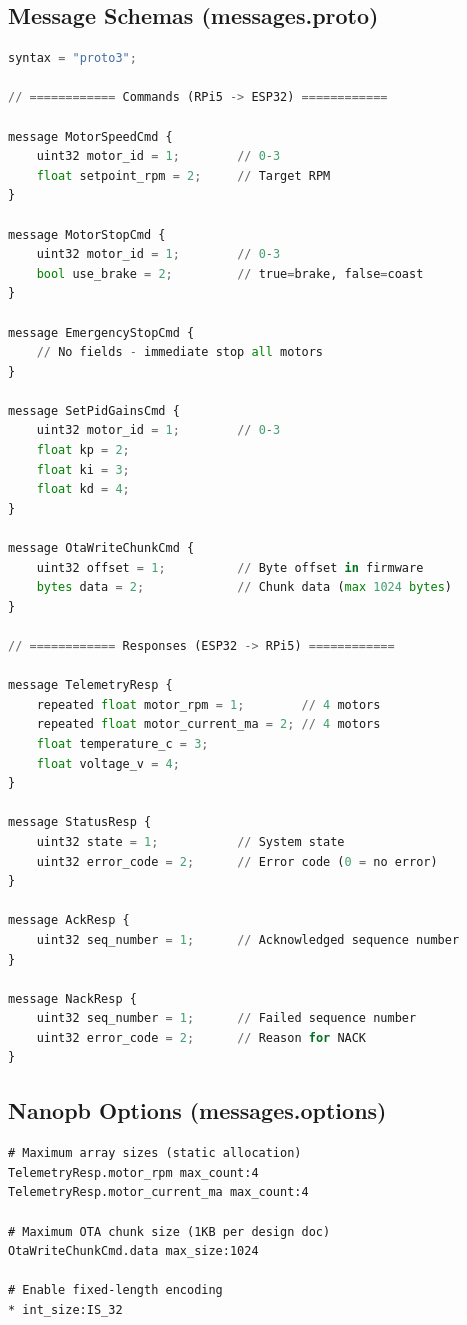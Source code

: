 \subsection{Message Schemas (messages.proto)}

\begin{lstlisting}[caption={messages.proto - Protocol Buffer Definitions},language=Python]
syntax = "proto3";

// ============ Commands (RPi5 -> ESP32) ============

message MotorSpeedCmd {
    uint32 motor_id = 1;        // 0-3
    float setpoint_rpm = 2;     // Target RPM
}

message MotorStopCmd {
    uint32 motor_id = 1;        // 0-3
    bool use_brake = 2;         // true=brake, false=coast
}

message EmergencyStopCmd {
    // No fields - immediate stop all motors
}

message SetPidGainsCmd {
    uint32 motor_id = 1;        // 0-3
    float kp = 2;
    float ki = 3;
    float kd = 4;
}

message OtaWriteChunkCmd {
    uint32 offset = 1;          // Byte offset in firmware
    bytes data = 2;             // Chunk data (max 1024 bytes)
}

// ============ Responses (ESP32 -> RPi5) ============

message TelemetryResp {
    repeated float motor_rpm = 1;        // 4 motors
    repeated float motor_current_ma = 2; // 4 motors
    float temperature_c = 3;
    float voltage_v = 4;
}

message StatusResp {
    uint32 state = 1;           // System state
    uint32 error_code = 2;      // Error code (0 = no error)
}

message AckResp {
    uint32 seq_number = 1;      // Acknowledged sequence number
}

message NackResp {
    uint32 seq_number = 1;      // Failed sequence number
    uint32 error_code = 2;      // Reason for NACK
}
\end{lstlisting}

\subsection{Nanopb Options (messages.options)}

\begin{lstlisting}[caption={messages.options - Static Allocation Config}]
# Maximum array sizes (static allocation)
TelemetryResp.motor_rpm max_count:4
TelemetryResp.motor_current_ma max_count:4

# Maximum OTA chunk size (1KB per design doc)
OtaWriteChunkCmd.data max_size:1024

# Enable fixed-length encoding
* int_size:IS_32
\end{lstlisting}

